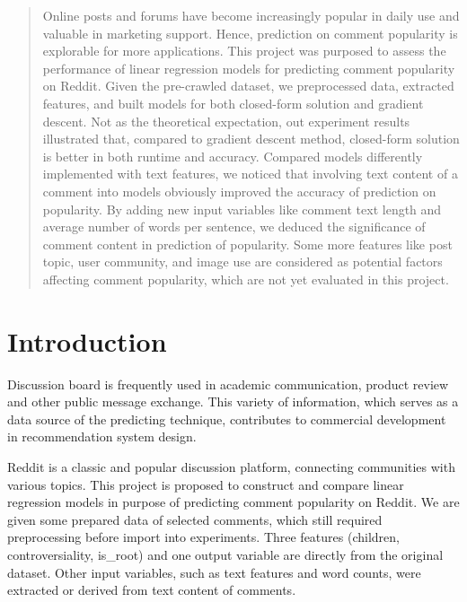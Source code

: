 \documentclass[letterpaper, 11pt]{article}
\begin{document}

\clearpage
\setcounter{page}{2}

\singlespacing

\begin{abstract}
Online posts and forums have become increasingly popular in daily use and valuable in marketing support. Hence, prediction on comment popularity is explorable for more applications. This project was purposed to assess the performance of linear regression models for predicting comment popularity on Reddit. Given the pre-crawled dataset, we preprocessed data, extracted features, and built models for both closed-form solution and gradient descent. Not as the theoretical expectation, out experiment results illustrated that, compared to gradient descent method, closed-form solution is better in both runtime and accuracy. Compared models differently implemented with text features, we noticed that involving text content of a comment into models obviously improved the accuracy of prediction on popularity. By adding new input variables like comment text length and average number of words per sentence, we deduced the significance of comment content in prediction of popularity. Some more features like post topic, user community, and image use are considered as potential factors affecting comment popularity, which are not yet evaluated in this project.
\end{abstract}

\section*{Introduction}
Discussion board is frequently used in academic communication, product review and other public message exchange. This variety of information, which serves as a data source of the predicting technique, contributes to commercial development in recommendation system design\cite{rohlin2016popularity}.

Reddit is a classic and popular discussion platform, connecting communities with various topics. This project is proposed to construct and compare linear regression models in purpose of predicting comment popularity on Reddit. We are given some prepared data of selected comments, which still required preprocessing before import into experiments. Three features (children, controversiality, is\_root) and one output variable are directly from the original dataset. Other input variables, such as text features and word counts, were extracted or derived from text content of comments.
\end{document}
